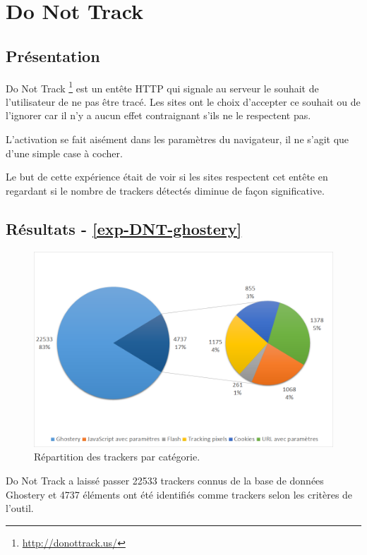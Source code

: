 \section{Do Not Track}
\subsection{Présentation}
Do Not Track \footnote{\url{http://donottrack.us/}} est un entête HTTP qui signale au serveur le souhait de l'utilisateur de ne pas être tracé. Les sites ont le choix d'accepter ce souhait ou de l'ignorer car il n'y a aucun effet contraignant s'ils ne le respectent pas.

L'activation se fait aisément dans les paramètres du navigateur, il ne s'agit que d'une simple case à cocher.

Le but de cette expérience était de voir si les sites respectent cet entête en regardant si le nombre de trackers détectés diminue de façon significative.

\subsection{Résultats - \autoref{exp-DNT-ghostery}}
\begin{figure}[!h]
	\centering
	\includegraphics[scale=.6]{resultats/ANALYSES/Images/DNT-Ghostery.png}
	\caption{\label{exp-DNT-ghostery}Répartition des trackers par catégorie.}
\end{figure}

Do Not Track a laissé passer 22533 trackers connus de la base de données Ghostery et 4737 éléments ont été identifiés comme trackers selon les critères de l'outil.\\

